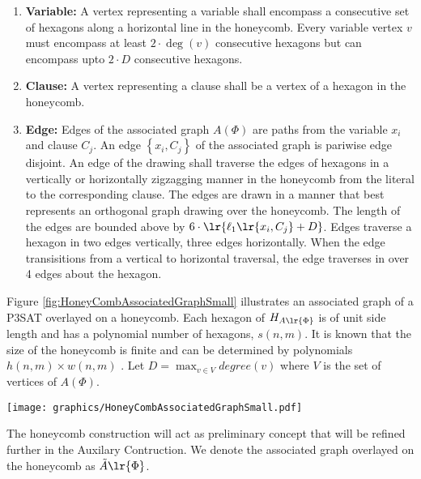 \begin{enumerate}
\item \textbf{Variable:} A vertex representing a variable shall encompass a consecutive set of hexagons along a horizontal line in the honeycomb. 
Every variable vertex $v$  must encompass at least $2 \cdot \deg(v)$ consecutive hexagons but can encompass upto $2 \cdot D$ consecutive hexagons.
\item \textbf{Clause:} A vertex representing a clause shall be a vertex of a hexagon in the honeycomb.
\item \textbf{Edge:} Edges of the associated graph $A(\Phi)$ are paths from the variable $x_i$ and clause $C_j$.  An edge $\left\lbrace x_i, C_j \right\rbrace$ of the associated graph is pariwise edge disjoint. 
An edge of the drawing shall traverse the edges of hexagons in a vertically or horizontally zigzagging manner in the honeycomb from the literal to the corresponding clause. 
The edges are drawn in a manner that best represents an orthogonal graph drawing over the honeycomb.  
The length of the edges are bounded above by $6 \cdot \lr{\ell_1 \lr{x_i,C_j} + D}$. Edges traverse a hexagon in two edges vertically, three edges horizontally.
  When the edge transisitions from a vertical to horizontal traversal, the edge traverses in over 4 edges about the hexagon.
\end{enumerate}
Figure \ref{fig:HoneyCombAssociatedGraphSmall} illustrates an associated graph of a P3SAT overlayed on a honeycomb.
Each hexagon of $H_{A \lr{\Phi}}$ is of unit side length and has a polynomial number of hexagons, $s(n,m)$.
It is known that the size of the honeycomb is finite and can be determined by polynomials $h(n,m) \times w(n,m)$ \cite{BK+98}.
Let $D = \max_{v \in V} degree(v)$ where $V$ is the set of vertices of $A(\Phi)$.
\begin{minipage}{\linewidth}
\begin{center}
\texttt{[image: graphics/HoneyCombAssociatedGraphSmall.pdf]}
\label{fig:HoneyCombAssociatedGraphSmall}
\end{center}
\end{minipage}

The honeycomb construction will act as preliminary concept that will be refined further in the Auxilary Contruction.
We denote the associated graph overlayed on the honeycomb as $\tilde{A}\lr{\Phi}$.